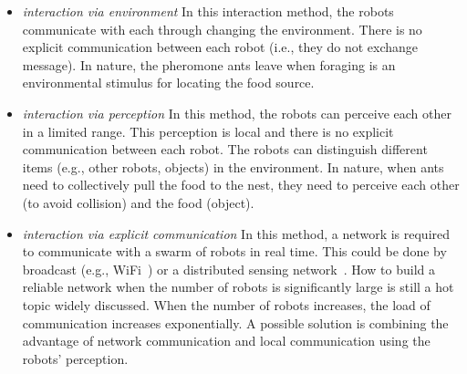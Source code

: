 \begin{itemize}

\item \textit{interaction via environment} In this interaction method, the robots communicate with each through changing the environment. There is no explicit communication between each robot (i.e., they do not exchange message). In nature, the pheromone ants leave when foraging is an environmental stimulus for locating the food source.  

\item \textit{interaction via perception} In this method, the robots can perceive each other in a limited range. This perception is local and there is no explicit communication between each robot. The robots can distinguish different items (e.g., other robots, objects) in the environment. In nature, when ants need to collectively pull the food to the nest, they need to perceive each other (to avoid collision) and the food (object).

\item \textit{interaction via explicit communication} In this method, a network is required to communicate with a swarm of robots in real time. This could be done by broadcast (e.g., WiFi~\cite{Gerkey:TRA:2002}) or a distributed sensing network~\cite{Winfield:LNCS:2000}. How to build a reliable network when the number of robots is significantly large is still a hot topic widely discussed. When the number of robots increases, the load of communication increases exponentially. A possible solution is combining the advantage of network communication and local communication using the robots' perception.

\end{itemize}

